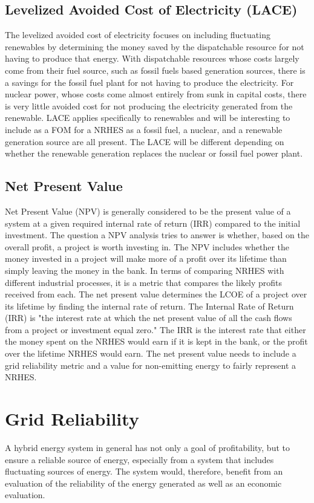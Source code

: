 \documentclass[12pt]{UIdahoMastersThesis}
\begin{document}
\subsection{Levelized Avoided Cost of Electricity (LACE)}
The levelized avoided cost of electricity focuses on including fluctuating renewables by determining the money saved by the dispatchable resource for not having to produce that energy. With dispatchable resources whose costs largely come from their fuel source, such as fossil fuels based generation sources, there is a savings for the fossil fuel plant for not having to produce the electricity.  For nuclear power, whose costs come almost entirely from sunk in capital costs, there is very little avoided cost for not producing the electricity generated from the renewable.  LACE applies specifically to renewables and will be interesting to include as a FOM for a NRHES as a fossil fuel, a nuclear, and a renewable generation source are all present. The LACE will be different depending on whether the renewable generation replaces the nuclear or fossil fuel power plant.  
\subsection{Net Present Value}
Net Present Value (NPV) is generally considered to be the present value of a system at a given required internal rate of return (IRR) compared to the initial investment. The question a NPV analysis tries to answer is whether, based on the overall profit, a project is worth investing in.  The NPV includes whether the money invested in a project will make more of a profit over its lifetime than simply leaving the money in the bank.  In terms of comparing NRHES with different industrial processes, it is a metric that compares the likely profits received from each.  The net present value determines the LCOE of a project over its lifetime by finding the internal rate of return.  The Internal Rate of Return (IRR) is "the interest rate at which the net present value of all the cash flows from a project or investment equal zero."  The IRR is the interest rate that either the money spent on the NRHES would earn if it is kept in the bank, or the profit over the lifetime NRHES would earn.  The net present value needs to include a grid reliability metric and a value for non-emitting energy to fairly represent a NRHES. 
\section{Grid Reliability}
A hybrid energy system in general has not only a goal of profitability, but to ensure a reliable source of energy, especially from a system that includes fluctuating sources of energy. The system would, therefore, benefit from an evaluation of the reliability of the energy generated as well as an economic evaluation. 
\end{document}
